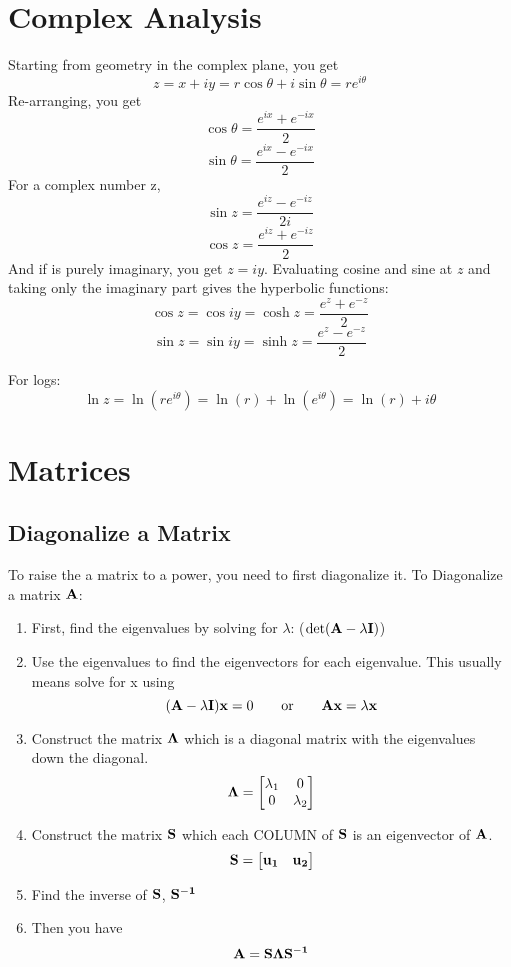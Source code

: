 \documentclass{article}
\begin{document}
\section{Complex Analysis}
Starting from geometry in the complex plane, you get
$$
z = x + iy = r\cos\theta + i\sin\theta = re^{i\theta}
$$
Re-arranging, you get
$$
\cos\theta = \frac{e^{ix} + e^{-ix}}{2}
$$
$$
\sin\theta = \frac{e^{ix} - e^{-ix}}{2}
$$
For a complex number z,
$$
\sin z = \frac{e^{iz} - e^{-iz}}{2i}
$$
$$
\cos z = \frac{e^{iz} + e^{-iz}}{2}
$$
And if is purely imaginary, you get $z=iy$.  Evaluating cosine and sine at $z$ and taking only the imaginary part gives the hyperbolic functions:
$$
\cos z = \cos iy = \cosh z = \frac{e^z + e^{-z}}{2}
$$
$$
\sin z = \sin iy = \sinh z = \frac{e^z - e^{-z}}{2}
$$

For logs:
$$
\ln z = \ln(re^{i\theta}) = \ln(r) +  \ln(e^{i\theta}) = \ln(r) + i\theta
$$

\section{Matrices}
\subsection{Diagonalize a Matrix}
To raise the a matrix to a power, you need to first diagonalize it. To Diagonalize a matrix $\vb{A}$:

\begin{enumerate}
	\item First, find the eigenvalues by solving for $\lambda$: ($\det(\vb{A}-\lambda \vb{I})$)
	\item Use the eigenvalues to find the eigenvectors for each eigenvalue.  This usually means solve for x using
	      $$
	      (\vb{A} - \lambda \vb{I})\vb{x} = 0 \qquad \text{or} \qquad \vb{A}\vb{x} = \lambda \vb{x}
	      $$
	\item Construct the matrix $\vb{\Lambda}$ which is a diagonal matrix with the eigenvalues down the diagonal.
	      $$
	      \vb{\Lambda} = 
	      \begin{bmatrix}
	      	\lambda_1 & 0         \\
	      	0         & \lambda_2 
	      \end{bmatrix}
	      $$
	\item Construct the matrix $\vb{S}$ which each COLUMN of $\vb{S}$ is an eigenvector of $\vb{A}$.
	      $$
	      \vb{S} = 
	      \begin{bmatrix}
	      	\vb{u_1} &   
	      	\vb{u_2}
	      \end{bmatrix}
	      $$
	\item Find the inverse of $\vb{S}$, $\vb{S^{-1}}$
	\item Then you have
	      $$
	      \vb{A} = \vb{S}\vb{\Lambda}{\vb{S^{-1}}}
	      $$
\end{enumerate}
\end{document}
